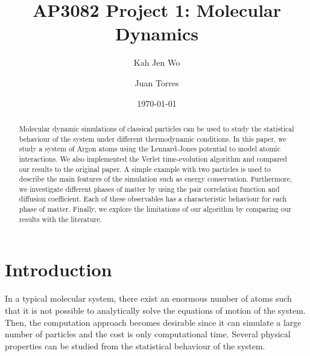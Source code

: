 \documentclass[pra,aps,superscriptaddress,amssymb,amsmath,reprint,noeprint,floatfix]{revtex4-2}
\begin{document}
\title{AP3082 Project 1: Molecular Dynamics}
\date{\today}

\author{Kah Jen Wo}
\author{Juan Torres}

\begin{abstract}
Molecular dynamic simulations of classical particles can be used to study the statistical behaviour of the system under different thermodynamic conditions. In this paper, we study a system of Argon atoms using the Lennard-Jones potential to model atomic interactions. We also implemented the Verlet time-evolution algorithm \cite{PhysRev.159.98} and compared our results to the original paper. A simple example with two particles is used to describe the main features of the simulation such as energy conservation. Furthermore, we investigate different phases of matter by using the pair correlation function and diffusion coefficient. Each of these observables has a characteristic behaviour for each phase of matter. Finally, we explore the limitations of our algorithm by comparing our results with the literature.
\end{abstract}
\maketitle

\section{\label{sec: Introduction}Introduction}
In a typical molecular system, there exist an enormous number of atoms such that it is not possible to analytically solve the equations of motion of the system. Then, the computation approach becomes desirable since it can simulate a large number of particles and the cost is only computational time. Several physical properties can be studied from the statistical behaviour of the system.
\end{document}
